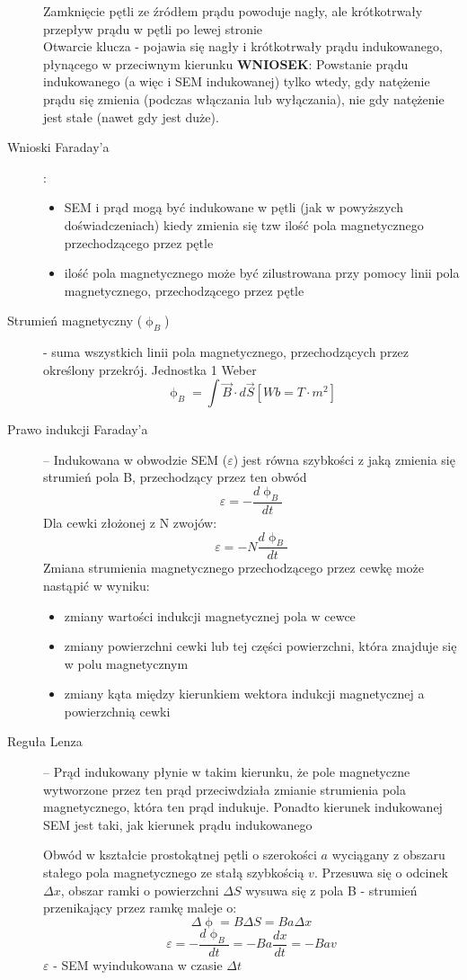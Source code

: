 \documentclass[a4paper,11pt]{article}
\begin{document}
\begin{description}
  Zamknięcie pętli ze źródłem prądu powoduje nagły, ale krótkotrwały przepływ prądu w pętli po lewej stronie\\
  Otwarcie klucza - pojawia się nagły i krótkotrwały prądu indukowanego, płynącego w przeciwnym kierunku
  \textbf{WNIOSEK}: Powstanie prądu indukowanego (a więc i SEM indukowanej) tylko wtedy, gdy natężenie prądu się zmienia (podczas włączania lub wyłączania), nie gdy natężenie jest stałe (nawet gdy jest duże).
\item [Wnioski Faraday'a]: 
  \begin{itemize}
  \item SEM i prąd mogą być indukowane w pętli (jak w powyższych doświadczeniach) kiedy zmienia się tzw ilość pola magnetycznego przechodzącego przez pętle
  \item ilość pola magnetycznego może być zilustrowana przy pomocy linii pola magnetycznego, przechodzącego przez pętle
  \end{itemize}

\item[Strumień magnetyczny ($\upphi_B$)] - suma wszystkich linii pola magnetycznego, przechodzących przez określony przekrój. Jednostka 1 Weber
  $$\upphi_B = \int \vec{B}\cdot d\vec{S} \left[Wb=T\cdot m^2 \right]$$
\item[Prawo indukcji Faraday'a] -- Indukowana w obwodzie SEM ($\varepsilon$) jest równa szybkości z jaką zmienia się strumień pola B, przechodzący przez ten obwód
  $$\varepsilon=-\frac{d\upphi_B}{dt}$$
  Dla cewki złożonej z N zwojów:
  $$\varepsilon = -N\frac{d\upphi_B}{dt}$$
  Zmiana strumienia magnetycznego przechodzącego przez cewkę może nastąpić w wyniku:
  \begin{itemize}
  \item zmiany wartości indukcji magnetycznej pola w cewce
  \item zmiany powierzchni cewki lub tej części powierzchni, która znajduje się w polu magnetycznym
  \item zmiany kąta między kierunkiem wektora indukcji magnetycznej a powierzchnią cewki
  \end{itemize}
\item[Reguła Lenza] -- Prąd indukowany płynie w takim kierunku, że pole magnetyczne wytworzone przez ten prąd przeciwdziała zmianie strumienia pola magnetycznego, która ten prąd indukuje. Ponadto kierunek indukowanej SEM jest taki, jak kierunek prądu indukowanego

  Obwód w kształcie prostokątnej pętli  o szerokości $a$ wyciągany z obszaru stałego pola magnetycznego ze stałą szybkością $v$. Przesuwa się o odcinek $\Delta x$, obszar ramki o powierzchni $\Delta S$ wysuwa się z pola B - strumień przenikający przez ramkę maleje o:
  $$\Delta\upphi=B\Delta S = Ba\Delta x$$
  $$\varepsilon = -\frac{d\upphi_B}{dt} = -Ba\frac{dx}{dt} = -Bav$$
  $\varepsilon$ - SEM wyindukowana w czasie $\Delta t$ 


\end{description}
\end{document}
